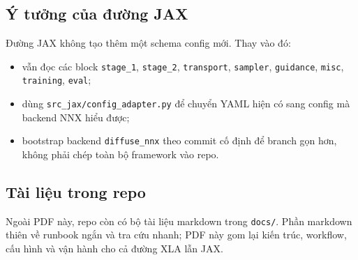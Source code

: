 \subsection{Ý tưởng của đường JAX}

Đường JAX không tạo thêm một schema config mới. Thay vào đó:

\begin{itemize}[leftmargin=1.5em]
  \item vẫn đọc các block \texttt{stage\_1}, \texttt{stage\_2},
  \texttt{transport}, \texttt{sampler}, \texttt{guidance}, \texttt{misc},
  \texttt{training}, \texttt{eval};
  \item dùng \texttt{src\_jax/config\_adapter.py} để chuyển YAML hiện có sang
  config mà backend NNX hiểu được;
  \item bootstrap backend \texttt{diffuse\_nnx} theo commit cố định để branch
  gọn hơn, không phải chép toàn bộ framework vào repo.
\end{itemize}

\subsection{Tài liệu trong repo}

Ngoài PDF này, repo còn có bộ tài liệu markdown trong \texttt{docs/}. Phần
markdown thiên về runbook ngắn và tra cứu nhanh; PDF này gom lại kiến trúc,
workflow, cấu hình và vận hành cho cả đường XLA lẫn JAX.
